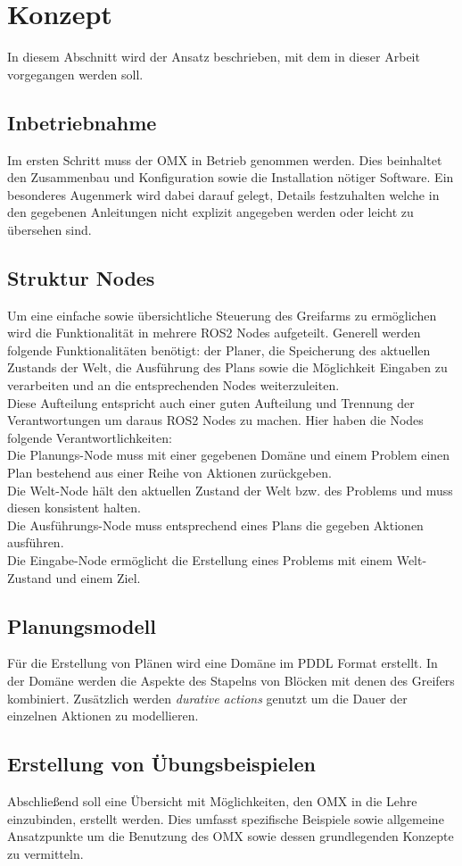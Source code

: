\section{Konzept}
In diesem Abschnitt wird der Ansatz beschrieben, mit dem in dieser Arbeit vorgegangen werden soll.
\subsection{Inbetriebnahme}
Im ersten Schritt muss der OMX in Betrieb genommen werden. Dies beinhaltet den Zusammenbau und Konfiguration sowie die Installation nötiger Software. Ein besonderes Augenmerk wird dabei darauf gelegt,  Details festzuhalten welche in den gegebenen Anleitungen nicht explizit angegeben werden oder leicht zu übersehen sind.
\subsection{Struktur Nodes}
Um eine einfache sowie übersichtliche Steuerung des Greifarms zu ermöglichen wird die Funktionalität in mehrere ROS2 Nodes aufgeteilt. Generell werden folgende Funktionalitäten benötigt: der Planer, die Speicherung des aktuellen Zustands der Welt, die Ausführung des Plans sowie die Möglichkeit Eingaben zu verarbeiten und an die entsprechenden Nodes weiterzuleiten.\\
Diese Aufteilung entspricht auch einer guten Aufteilung und Trennung der Verantwortungen um daraus ROS2 Nodes zu machen. Hier haben die Nodes folgende Verantwortlichkeiten:\\
Die Planungs-Node muss mit einer gegebenen Domäne und einem Problem einen Plan bestehend aus einer Reihe von Aktionen zurückgeben.\\
Die Welt-Node hält den aktuellen Zustand der Welt bzw. des Problems und muss diesen konsistent halten.\\
Die Ausführungs-Node muss entsprechend eines Plans die gegeben Aktionen ausführen.\\
Die Eingabe-Node ermöglicht die Erstellung eines Problems mit einem Welt-Zustand und einem Ziel.
\subsection{Planungsmodell}
Für die Erstellung von Plänen wird eine Domäne im \ac{PDDL} Format erstellt. In der Domäne werden die Aspekte des Stapelns von Blöcken mit denen des Greifers kombiniert. Zusätzlich werden \emph{durative actions} genutzt um die Dauer der einzelnen Aktionen zu modellieren.
\subsection{Erstellung von Übungsbeispielen}
Abschließend soll eine Übersicht mit Möglichkeiten, den OMX in die Lehre einzubinden,  erstellt werden. Dies umfasst spezifische Beispiele sowie allgemeine Ansatzpunkte um die Benutzung des OMX sowie dessen grundlegenden Konzepte zu vermitteln.